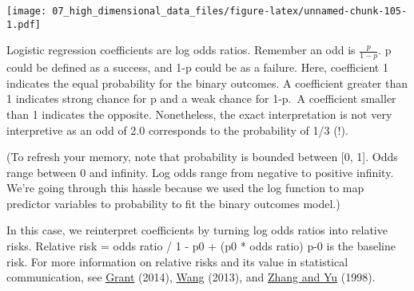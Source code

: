 \documentclass[
]{book}
\newenvironment{Shaded}{\begin{snugshade}}{\end{snugshade}}
\newcommand{\CommentTok}[1]{\textcolor[rgb]{0.56,0.35,0.01}{\textit{#1}}}
\newcommand{\ControlFlowTok}[1]{\textcolor[rgb]{0.13,0.29,0.53}{\textbf{#1}}}
\newcommand{\DecValTok}[1]{\textcolor[rgb]{0.00,0.00,0.81}{#1}}
\newcommand{\FunctionTok}[1]{\textcolor[rgb]{0.00,0.00,0.00}{#1}}
\newcommand{\NormalTok}[1]{#1}
\newcommand{\OtherTok}[1]{\textcolor[rgb]{0.56,0.35,0.01}{#1}}
\newcommand{\SpecialCharTok}[1]{\textcolor[rgb]{0.00,0.00,0.00}{#1}}
\newcommand{\StringTok}[1]{\textcolor[rgb]{0.31,0.60,0.02}{#1}}
\begin{document}
\texttt{[image: 07\_high\_dimensional\_data\_files/figure-latex/unnamed-chunk-105-1.pdf]}

Logistic regression coefficients are log odds ratios. Remember an odd is \(\frac{p}{1-p}\). p could be defined as a success, and 1-p could be as a failure. Here, coefficient 1 indicates the equal probability for the binary outcomes. A coefficient greater than 1 indicates strong chance for p and a weak chance for 1-p.~A coefficient smaller than 1 indicates the opposite. Nonetheless, the exact interpretation is not very interpretive as an odd of 2.0 corresponds to the probability of 1/3 (!).

(To refresh your memory, note that probability is bounded between {[}0, 1{]}. Odds range between 0 and infinity. Log odds range from negative to positive infinity. We're going through this hassle because we used the log function to map predictor variables to probability to fit the binary outcomes model.)

In this case, we reinterpret coefficients by turning log odds ratios into relative risks. Relative risk = odds ratio / 1 - p0 + (p0 * odds ratio) p-0 is the baseline risk. For more information on relative risks and its value in statistical communication, see \href{https://www.bmj.com/content/348/bmj.f7450}{Grant} (2014), \href{https://www.jstatsoft.org/article/view/v055i05}{Wang} (2013), and \href{https://jamanetwork.com/journals/jama/fullarticle/188182}{Zhang and Yu} (1998).

\begin{Shaded}
\end{Shaded}
\end{document}

